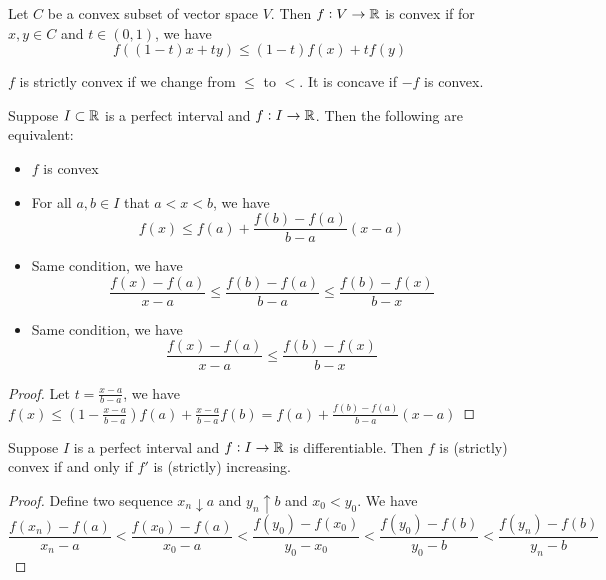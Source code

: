 \begin{definition}
    Let $C$ be a convex subset of vector space $V$. Then $f:V \rightarrow \mathbb{R}$ is convex if for $x,y \in C$ and $t \in (0,1)$, we have
    \begin{equation}
        f\left( (1-t)x + ty \right) \leq (1-t) f(x) + t f(y)
    \end{equation}
    
    $f$ is strictly convex if we change from $\leq$ to $<$. It is concave if $-f$ is convex.
\end{definition}

\begin{theorem}
    Suppose $I \subset \mathbb{R}$ is a perfect interval and $f: I \rightarrow \mathbb{R}$. Then the following are equivalent:
    \begin{itemize}
        \item $f$ is convex
        \item For all $a,b \in I$ that $a < x < b$, we have \begin{equation}
            f(x) \leq f(a) + \frac{f(b) - f(a)}{b-a} (x-a)
        \end{equation}
        \item Same condition, we have \begin{equation}
            \frac{f(x) - f(a)}{x - a} \leq \frac{f(b) - f(a)}{b - a} \leq \frac{f(b) - f(x)}{b - x}
        \end{equation}
        \item Same condition, we have \begin{equation}
            \frac{f(x) - f(a)}{x - a} \leq \frac{f(b) - f(x)}{b - x}
        \end{equation}
    \end{itemize}
\end{theorem}
\begin{proof}
    Let $t = \frac{x-a}{b-a}$, we have $f(x) \leq \left(1 - \frac{x-a}{b-a}\right)f(a) + \frac{x-a}{b-a}f(b) = f(a) + \frac{f(b) - f(a)}{b-a}(x-a) $
\end{proof}

\begin{theorem}
    Suppose $I$ is a perfect interval and $f: I \rightarrow \mathbb{R}$ is differentiable. Then $f$ is (strictly) convex if and only if $f'$ is (strictly) increasing.
\end{theorem}
\begin{proof}
    Define two sequence $x_n \downarrow a$ and $y_n \uparrow b$ and $x_0 < y_0$. We have
    \begin{equation}
        \frac{f(x_n) - f(a)}{x_n - a} < \frac{f(x_0) - f(a)}{x_0 - a} < \frac{f(y_0) - f(x_0)}{y_0 - x_0} < \frac{f(y_0) - f(b)}{y_0 - b} < \frac{f(y_n) - f(b)}{y_n - b}
    \end{equation}
\end{proof}




